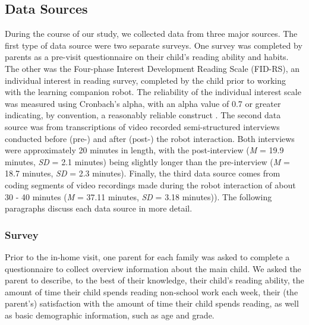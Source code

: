 \documentclass{sigchi}
\begin{document}
\subsection{Data Sources}
During the course of our study, we collected data from three major sources. The first type of data source were two separate surveys. One survey was completed by parents as a pre-visit questionnaire on their child's reading ability and habits. The other was the Four-phase Interest Development Reading Scale (FID-RS), an individual interest in reading survey, completed by the child prior to working with the learning companion robot. The reliability of the individual interest scale was measured using Cronbach's alpha, with an alpha value of 0.7 or greater indicating, by convention, a reasonably reliable construct \cite{Crocker:2009}. The second data source was from transcriptions of video recorded semi-structured interviews conducted before (pre-) and after (post-) the robot interaction. Both interviews were approximately 20 minutes in length, with the post-interview (\textit{M} = 19.9 minutes, \textit{SD} = 2.1 minutes) being slightly longer than the pre-interview (\textit{M} = 18.7 minutes, \textit{SD} = 2.3 minutes). Finally, the third data source comes from coding segments of video recordings made during the robot interaction of about 30 - 40 minutes (\textit{M} = 37.11 minutes, \textit{SD} = 3.18 minutes)). The following paragraphs discuss each data source in more detail.


\subsubsection{Survey}
Prior to the in-home visit, one parent for each family was asked to complete a questionnaire to collect overview information about the main child. We asked the parent to describe, to the best of their knowledge, their child's reading ability, the amount of time their child spends reading non-school work each week, their (the parent's) satisfaction with the amount of time their child spends reading, as well as basic demographic information, such as age and grade.
 
\end{document}
